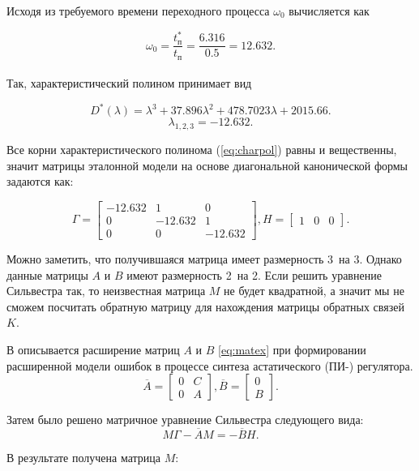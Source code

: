 
Исходя из требуемого времени переходного процесса $\omega_0$ вычисляется как

$$
  \omega_0=\frac{t_{\text{п}}^{\text{*}}}{t_{\text{п}}}=\frac{6.316}{0.5}=12.632.
$$\\
Так, характеристический полином принимает вид

\begin{equation}
  D^{\text{*}}(\lambda)=\lambda^3+37.896\lambda^2+478.7023\lambda+2015.66.
  \label{eq:charpol}
\end{equation}
$$
  \lambda_{1,2,3}=-12.632.
$$

Все корни характеристического полинома (\ref{eq:charpol}) равны и вещественны, значит
матрицы эталонной модели на основе диагональной канонической формы 
задаются как:

$$
  \Gamma=\begin{bmatrix}-12.632&1&0\\0&-12.632&1\\0&0&-12.632\end{bmatrix}, H=\begin{bmatrix}1&0&0\end{bmatrix}.
$$

Можно заметить, что получившаяся матрица имеет размерность 3~на 3. Однако данные матрицы 
$A$ и $B$ имеют размерность 2~на 2. Если решить уравнение Сильвестра так, то неизвестная
матрица $M$ не будет квадратной, а значит мы не сможем посчитать обратную матрицу
для нахождения матрицы обратных связей $K$.

В \cite{МодальноеУправление} описывается расширение матриц $A$ и $B$ \ref{eq:matex} при
формировании расширенной модели ошибок в процессе
синтеза астатического (ПИ-) регулятора.
\begin{equation}
  \overline{A}=\begin{bmatrix}0&C\\0&A\end{bmatrix}, \overline{B}=\begin{bmatrix}0\\B\end{bmatrix}.
  \label{eq:matex}
\end{equation}

Затем было решено матричное уравнение Сильвестра следующего вида:
$$
  M\Gamma-\overline{A}M=-\overline{B}H.
$$

В результате получена матрица $M$:

